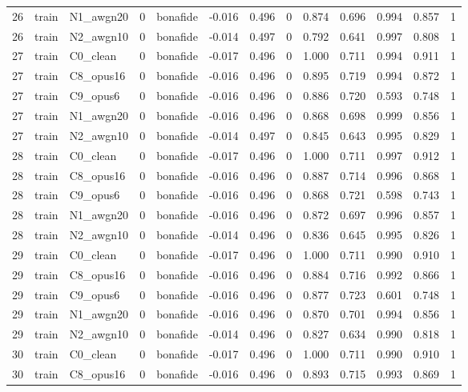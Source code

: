 \begin{tabular}{rllrlrrrrrrrr}
26 & train & N1_awgn20 & 0 & bonafide & -0.016 & 0.496 & 0 & 0.874 & 0.696 & 0.994 & 0.857 & 1 \\
26 & train & N2_awgn10 & 0 & bonafide & -0.014 & 0.497 & 0 & 0.792 & 0.641 & 0.997 & 0.808 & 1 \\
27 & train & C0_clean & 0 & bonafide & -0.017 & 0.496 & 0 & 1.000 & 0.711 & 0.994 & 0.911 & 1 \\
27 & train & C8_opus16 & 0 & bonafide & -0.016 & 0.496 & 0 & 0.895 & 0.719 & 0.994 & 0.872 & 1 \\
27 & train & C9_opus6 & 0 & bonafide & -0.016 & 0.496 & 0 & 0.886 & 0.720 & 0.593 & 0.748 & 1 \\
27 & train & N1_awgn20 & 0 & bonafide & -0.016 & 0.496 & 0 & 0.868 & 0.698 & 0.999 & 0.856 & 1 \\
27 & train & N2_awgn10 & 0 & bonafide & -0.014 & 0.497 & 0 & 0.845 & 0.643 & 0.995 & 0.829 & 1 \\
28 & train & C0_clean & 0 & bonafide & -0.017 & 0.496 & 0 & 1.000 & 0.711 & 0.997 & 0.912 & 1 \\
28 & train & C8_opus16 & 0 & bonafide & -0.016 & 0.496 & 0 & 0.887 & 0.714 & 0.996 & 0.868 & 1 \\
28 & train & C9_opus6 & 0 & bonafide & -0.016 & 0.496 & 0 & 0.868 & 0.721 & 0.598 & 0.743 & 1 \\
28 & train & N1_awgn20 & 0 & bonafide & -0.016 & 0.496 & 0 & 0.872 & 0.697 & 0.996 & 0.857 & 1 \\
28 & train & N2_awgn10 & 0 & bonafide & -0.014 & 0.496 & 0 & 0.836 & 0.645 & 0.995 & 0.826 & 1 \\
29 & train & C0_clean & 0 & bonafide & -0.017 & 0.496 & 0 & 1.000 & 0.711 & 0.990 & 0.910 & 1 \\
29 & train & C8_opus16 & 0 & bonafide & -0.016 & 0.496 & 0 & 0.884 & 0.716 & 0.992 & 0.866 & 1 \\
29 & train & C9_opus6 & 0 & bonafide & -0.016 & 0.496 & 0 & 0.877 & 0.723 & 0.601 & 0.748 & 1 \\
29 & train & N1_awgn20 & 0 & bonafide & -0.016 & 0.496 & 0 & 0.870 & 0.701 & 0.994 & 0.856 & 1 \\
29 & train & N2_awgn10 & 0 & bonafide & -0.014 & 0.496 & 0 & 0.827 & 0.634 & 0.990 & 0.818 & 1 \\
30 & train & C0_clean & 0 & bonafide & -0.017 & 0.496 & 0 & 1.000 & 0.711 & 0.990 & 0.910 & 1 \\
30 & train & C8_opus16 & 0 & bonafide & -0.016 & 0.496 & 0 & 0.893 & 0.715 & 0.993 & 0.869 & 1 \\

\end{tabular}
